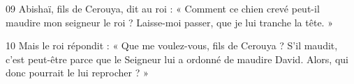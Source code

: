 
09 Abishaï, fils de Cerouya, dit au roi : « Comment ce chien crevé peut-il maudire mon seigneur le roi ? Laisse-moi passer, que je lui tranche la tête. »

10 Mais le roi répondit : « Que me voulez-vous, fils de Cerouya ? S’il maudit, c’est peut-être parce que le Seigneur lui a ordonné de maudire David. Alors, qui donc pourrait le lui reprocher ? »
